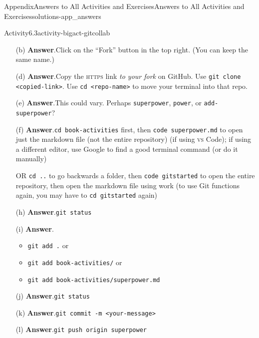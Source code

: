 \documentclass[oneside,10pt,]{book}
\newcommand{\blocktitlefont}{\relax}
\newcommand{\mono}[1]{\texttt{#1}}
\newcommand{\initialism}[1]{\textsc{\MakeLowercase{#1}}}
\begin{document}
\begin{solutions-chapter}{Appendix}{Answers to All Activities and Exercises}{}{Answers to All Activities and Exercises}{}{}{solutions-app_answers}
\begin{activitysolution}{Activity}{6.3}{}{activity-bigact-gitcollab}
\begin{enumerate}[font=\bfseries,label=(\alph*),ref=\alph*]%
\item[(b)]\noindent\textbf{\blocktitlefont Answer}.\hypertarget{answer-bigact-gitcollab-c-b-back}{}\quad{}Click on the ``Fork'' button in the top right. (You can keep the same name.)%
\item[(d)]\noindent\textbf{\blocktitlefont Answer}.\hypertarget{answer-bigact-gitcollab-e-b-back}{}\quad{}Copy the \initialism{HTTPS} link \emph{to your fork} on GitHub. Use \mono{git clone <copied-link>}. Use \mono{cd <repo-name>} to move your terminal into that repo.%
\item[(e)]\noindent\textbf{\blocktitlefont Answer}.\hypertarget{answer-bigact-gitcollab-f-b-back}{}\quad{}This could vary. Perhaps \mono{superpower}, \mono{power}, or \mono{add-superpower}?%
\item[(f)]\noindent\textbf{\blocktitlefont Answer}.\hypertarget{answer-bigact-gitcollab-g-b-back}{}\quad{}\mono{cd book-activities} first, then \mono{code superpower.md} to open just the markdown file (not the entire repository) (if using \initialism{VS} Code); if using a different editor, use Google to find a good terminal command (or do it manually)%
\par
OR \mono{cd ..} to go backwards a folder, then \mono{code gitstarted} to open the entire repository, then open the markdown file using work (to use Git functions again, you may have to \mono{cd gitstarted} again)%
\item[(h)]\noindent\textbf{\blocktitlefont Answer}.\hypertarget{answer-bigact-gitcollab-i-b-back}{}\quad{}\mono{git status}%
\item[(i)]\noindent\textbf{\blocktitlefont Answer}.\hypertarget{answer-bigact-gitcollab-j-b-back}{}\quad{}%
\begin{itemize}[label=\textbullet]
\item{}\mono{git add .} or%
\item{}\mono{git add book-activities/} or%
\item{}\mono{git add book-activities/superpower.md}%
\end{itemize}
%
\item[(j)]\noindent\textbf{\blocktitlefont Answer}.\hypertarget{answer-bigact-gitcollab-k-b-back}{}\quad{}\mono{git status}%
\item[(k)]\noindent\textbf{\blocktitlefont Answer}.\hypertarget{answer-bigact-gitcollab-l-b-back}{}\quad{}\mono{git commit -m \textquotesingle{}<your-message>\textquotesingle{}}%
\item[(l)]\noindent\textbf{\blocktitlefont Answer}.\hypertarget{answer-bigact-gitcollab-m-b-back}{}\quad{}\mono{git push origin superpower}%

\end{enumerate}
\end{activitysolution}
\end{solutions-chapter}
\end{document}
